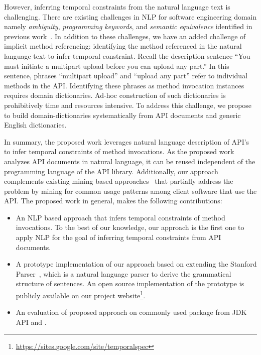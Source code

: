 However, inferring temporal constraints from the natural language text is challenging. 
There are existing challenges in NLP for software engineering domain namely \textit{ambiguity}, \textit{programming keywords}, and \textit{semantic equivalence} identified in previous work~\cite{pandita12:inferring}.
In addition to these challenges, we have an added challenge of 
implicit method referencing: identifying the method referenced in the natural language text to infer temporal constraint.
Recall the description sentence ``You must initiate a multipart upload before you can upload any part.''
In this sentence, phrases ``multipart upload'' and ``upload any part'' refer to individual methods in the API.
Identifying these phrases as method invocation instances requires domain dictionaries.
Ad-hoc construction of such dictionaries is prohibitively time and resources intensive.
To address this challenge, we propose to build domain-dictionaries systematically from API documents and generic English dictionaries.  

In summary, the proposed work leverages natural language description of API's to infer temporal constraints of method invocations.
As the proposed work analyzes API documents in natural language, it can be reused independent of the programming language of the API library.
Additionally, our approach complements existing mining based approaches~\cite{buse2012synthesizing, thummalapenta07parseweb, Wang:2013:MSR, Zhong:2009:MMR} that partially address the problem by mining for common usage patterns among client software that use the API.
The proposed work in general, makes the following contributions:


\begin{itemize}
	\item An NLP based approach that infers temporal constraints of method invocations. 
	To the best of our knowledge, our approach is the first one to apply NLP for the goal of inferring temporal constraints from API documents.
	\item A prototype implementation of our approach based on extending the Stanford Parser~\cite{Klein03}, which is a natural language parser to derive the grammatical structure of sentences.
	An open source implementation of the prototype is publicly available on our project website\footnote{\url{https://sites.google.com/site/temporalspec}}. 
	\item An evaluation of proposed approach on commonly used package  from JDK API and \amazonAPI. 
\end{itemize}


